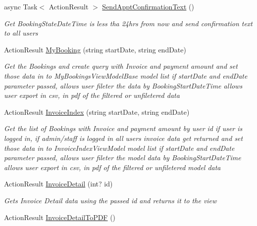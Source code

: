 \begin{DoxyCompactItemize}
async Task$<$ Action\+Result $>$ \hyperlink{class_alfa_accounting_1_1_controllers_1_1_booking_view_models_controller_a047e63d34c2b64f178b55351fa544e77}{Send\+Appt\+Confirmation\+Text} ()
\begin{DoxyCompactList}\small\item\em Get Booking\+State\+Date\+Time is less tha 24hrs from now and send confirmation text to all users \end{DoxyCompactList}\item 
Action\+Result \hyperlink{class_alfa_accounting_1_1_controllers_1_1_booking_view_models_controller_a361d39aedee7dbfdacfaae1c1a9c67cc}{My\+Booking} (string start\+Date, string end\+Date)
\begin{DoxyCompactList}\small\item\em Get the Bookings and create query with Invoice and payment amount and set those data in to My\+Bookings\+View\+Model\+Base model list if start\+Date and end\+Date parameter passed, allows user fileter the data by Booking\+Start\+Date\+Time allows user export in csv, in pdf of the filtered or unfiletered data \end{DoxyCompactList}\item 
Action\+Result \hyperlink{class_alfa_accounting_1_1_controllers_1_1_booking_view_models_controller_a346f77626590a070d12e96a5d69a837e}{Invoice\+Index} (string start\+Date, string end\+Date)
\begin{DoxyCompactList}\small\item\em Get the list of Bookings with Invoice and payment amount by user id if user is logged in, if admin/staff is logged in all user\textquotesingle{}s invoice data get returned and set those data in to Invoice\+Index\+View\+Model model list if start\+Date and end\+Date parameter passed, allows user fileter the model data by Booking\+Start\+Date\+Time allows user export in csv, in pdf of the filtered or unfiletered model data \end{DoxyCompactList}\item 
Action\+Result \hyperlink{class_alfa_accounting_1_1_controllers_1_1_booking_view_models_controller_a041402af1bece6737df3fb799dc16550}{Invoice\+Detail} (int? id)
\begin{DoxyCompactList}\small\item\em Gets Invoice Detail data using the passed id and returns it to the view \end{DoxyCompactList}\item 
Action\+Result \hyperlink{class_alfa_accounting_1_1_controllers_1_1_booking_view_models_controller_af36acd06396149c082418a6668673052}{Invoice\+Detail\+To\+P\+DF} ()

\end{DoxyCompactItemize}
